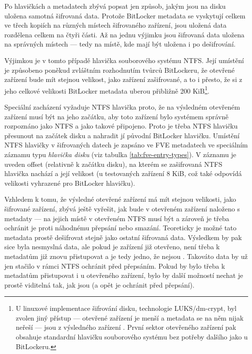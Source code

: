 Po hlavičkách a metadatech zbývá popsat jen způsob, jakým jsou na disku uložena samotná šifrovaná data. Protože BitLocker metadata se vyskytují celkem ve třech kopiích na různých místech  šifrovaného zařízení, jsou uložená data rozdělena celkem na čtyři části. Až na jednu výjimku jsou šifrovaná data uložena na správných místech --- tedy na místě, kde mají být uložena i po dešifrování.

Výjimkou je v tomto případě hlavička souborového systému NTFS. Její umístění je způsobeno poněkud zvláštním rozhodnutím tvůrců BitLockeru, že otevřené zařízení bude mít stejnou velikost, jako zařízení zašifrované, a to i přesto, že si z jeho celkové velikosti BitLocker metadata uberou přibližně 200 KiB\footnote{U linuxové implementace šifrování disku, technologie LUKS/dm-crypt, byl zvolen jiný přístup --- otevřené zařízení je menší a metadata se na něm nijak neřeší --- jsou z výsledného zařízení . První sektor otevřeného zařízení pak obsahuje standardní hlavičku souborového systému bez potřeby dalšího  jako u BitLockeru.}.


Speciální zacházení vyžaduje NTFS hlavička proto, že na výsledném otevřeném zařízení musí být na jeho začátku, aby toto zařízení bylo systémem správně rozpoznáno jako NTFS a jako takové připojeno. Proto je třeba NTFS hlavičku přesunout na začátek disku a nahradit jí původní BitLocker hlavičku. Umístění NTFS hlavičky v šifrovaných datech je zapsáno ve FVE metadatech ve speciálním záznamu typu \emph{hlavička disku} (viz tabulka \ref{tab:fve-entry-types}). V záznamu je uveden offset (relativně k začátku disku), na kterém se zašifrovaná NTFS hlavička nachází a její velikost (u testovaných zařízení 8 KiB, což také odpovídá velikosti vyhrazené pro BitLocker hlavičku).

Vzhledem k tomu, že výsledné otevřené zařízení má mít stejnou velikosti, jako šifrované zařízení, zbývá ještě vyřešit, jak bude v otevřeném zařízení naloženo s metadaty --- na jejich místě v otevřeném NTFS musí  být a zároveň je třeba ochránit je proti náhodnému přepsání nebo smazání. Teoreticky je možné tato metadata prostě dešifrovat stejně jako ostatní šifrovaná data. Výsledkem by pak sice byla nesmyslná data, ale pokud je zařízení již otevřeno, není třeba k metadatům již znovu přistupovat a je tedy jedno, že nejsou . Takováto  data by už jen stačilo v rámci NTFS ochránit před přepsáním. Pokud by bylo třeba k metadatům přistupovat i u otevřeného zařízení, bylo by další možností nechat je prostě viditelná tak, jak jsou (a opět je ochránit před přepsání).

